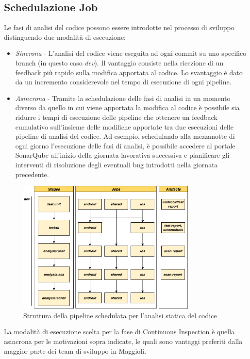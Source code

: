 \subsection{Schedulazione Job}
Le fasi di analisi del codice possono essere introdotte nel processo di sviluppo distinguendo due modalità di esecuzione:
\begin{itemize}
    \item \textit{Sincrona} - L'analisi del codice viene eseguita ad ogni commit su uno specifico branch (in questo caso \textit{dev}). Il vantaggio consiste nella ricezione di un feedback più rapido sulla modifica apportata al codice. Lo svantaggio è dato da un incremento considerevole nel tempo di esecuzione di ogni pipeline.
    \item \textit{Asincrona} - Tramite la schedulazione delle fasi di analisi in un momento diverso da quello in cui viene apportata la modifica al codice è possibile sia ridurre i tempi di esecuzione delle pipeline che ottenere un feedback cumulativo sull'insieme delle modifiche apportate tra due esecuzioni delle pipeline di analisi del codice. Ad esempio, schedulando alla mezzanotte di ogni giorno l'esecuzione delle fasi di analisi, è possibile accedere al portale SonarQube all'inizio della giornata lavorativa successiva e pianificare gli interventi di risoluzione degli eventuali bug introdotti nella giornata precedente.
\end{itemize}

\begin{figure}[H]
\centering
\includegraphics[width=0.8\textwidth]{img/tesi-16-cicd-scheduled.drawio.png}
\caption{Struttura della pipeline schedulata per l'analisi statica del codice}
\end{figure}

La modalità di esecuzione scelta per la fase di Continuous Inspection è quella asincrona per le motivazioni sopra indicate, le quali sono vantaggi preferiti dalla maggior parte dei team di sviluppo in Maggioli.


